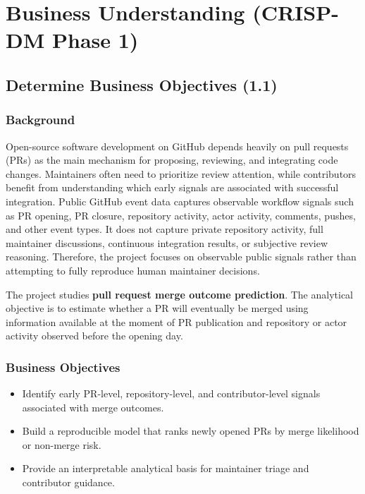 \section{Business Understanding (CRISP-DM Phase 1)}

\subsection{Determine Business Objectives (1.1)}

\subsubsection*{Background}

Open-source software development on GitHub depends heavily on pull requests (PRs) as the main mechanism for
proposing, reviewing, and integrating code changes. Maintainers often need to prioritize review attention,
while contributors benefit from understanding which early signals are associated with successful integration.
Public GitHub event data captures observable workflow signals such as PR opening, PR closure, repository
activity, actor activity, comments, pushes, and other event types. It does not capture private repository
activity, full maintainer discussions, continuous integration results, or subjective review reasoning.
Therefore, the project focuses on observable public signals rather than attempting to fully reproduce human
maintainer decisions.

The project studies \textbf{pull request merge outcome prediction}. The analytical objective is to estimate
whether a PR will eventually be merged using information available at the moment of PR publication and
repository or actor activity observed before the opening day.

\subsubsection*{Business Objectives}

\begin{itemize}
    \item Identify early PR-level, repository-level, and contributor-level signals associated with merge outcomes.
    \item Build a reproducible model that ranks newly opened PRs by merge likelihood or non-merge risk.
    \item Provide an interpretable analytical basis for maintainer triage and contributor guidance.
\end{itemize}

